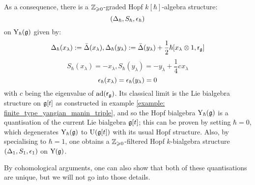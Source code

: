 \begin{example}
            As a consequence, there is a $\mathbb{Z}_{\geqslant 0}$-graded Hopf $k[\hbar]$-algebra structure:
                $$(\Delta_{\hbar}, S_{\hbar}, \epsilon_{\hbar})$$
            on $\mathrm{Y}_{\hbar}(\mathfrak{g})$ given by:
                $$\Delta_{\hbar}(x_{\lambda}) := \bar{\Delta}(x_{\lambda}), \Delta_{\hbar}(y_{\lambda}) := \bar{\Delta}(y_{\lambda}) + \frac12 \hbar [x_{\lambda} \tensor 1, \sfr_{\g}]$$
                $$S_{\hbar}(x_{\lambda}) = -x_{\lambda}, S_{\hbar}(y_{\lambda}) = -y_{\lambda} + \frac14 c_{} x_{\lambda}$$
                $$\epsilon_{\hbar}(x_{\lambda}) = \epsilon_{\hbar}(y_{\lambda}) = 0$$
            with $c$ being the eigenvalue of $\mathrm{ad}(\mathsf{r}_{\mathfrak{g}})$. Its classical limit is the Lie bialgebra structure on $\mathfrak{g}[t]$ as constructed in example \ref{example: finite_type_yangian_manin_triple}, and so the Hopf bialgebra $\mathrm{Y}_{\hbar}(\mathfrak{g})$ is a quantisation of the current Lie bialgebra $\mathfrak{g}[t]$; this can be proven by setting $\hbar = 0$, which degenerates $\mathrm{Y}_{\hbar}(\mathfrak{g})$ to $\mathrm{U}(\mathfrak{g}[t])$ with its usual Hopf structure. Also, by specialising to $\hbar = 1$, one obtains a $\mathbb{Z}_{\geqslant 0}$-filtered Hopf $k$-bialgebra structure $(\Delta_1, S_1, \epsilon_1)$ on $\mathrm{Y}(\mathfrak{g})$.
        \end{example}
        By cohomological arguments, one can also show that both of these quantisations are unique, but we will not go into those details.
        


